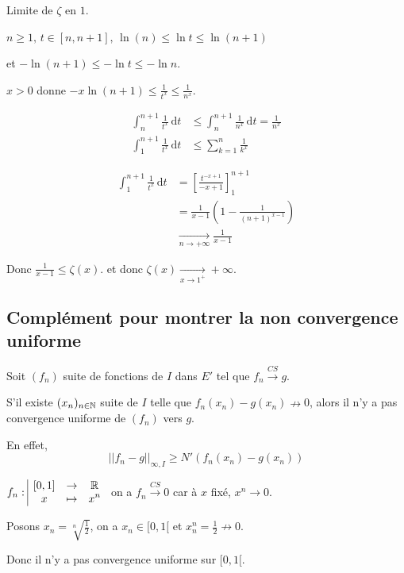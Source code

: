 \begin{exemple}
    Limite de $\zeta$ en $1$.

    $n \geqslant 1, \, t \in [n, n+ 1], \, \ln(n) \leqslant \ln t \leqslant \ln (n+ 1)$
    
    et $-\ln(n + 1) \leqslant - \ln t \leqslant - \ln n$.

    $x > 0$ donne $- x \ln(n + 1) \leqslant \frac 1 {t^x} \leqslant \frac 1 {n^x}$.

    \begin{align}
        \int_n^{n + 1} \frac 1 {t^x} \,\mathrm{d}t & \leqslant \int_n^{n + 1} \frac 1 {n^x} \,\mathrm{d}t = \frac 1 {n^x} \\
        \int_1^{n + 1} \frac 1 {t^x} \, \mathrm{d}t & \leqslant \sum_{k = 1 }^{n } \frac 1 {k^x} 
    \end{align}

    \begin{align}
        \int_{1 }^{n + 1 } \frac 1 {t^x} \, \mathrm{d}t &  = \left[ \frac{t^{- x + 1}}{- x + 1} \right]_{1}^{n + 1} \\
        & = \frac{1 }{x - 1} \left( 1 - \frac 1 {(n + 1)^{x - 1}} \right)\\
        & \xrightarrow[n \to + \infty]{} \frac 1 {x - 1}
    \end{align} 

    Donc $\frac 1 {x - 1} \leqslant \zeta(x)$. et donc $\zeta(x) \xrightarrow[x \to 1^+]{} + \infty$.
\end{exemple}

\subsection{Complément pour montrer la non convergence uniforme}

\begin{proposition}{}{}
    Soit $(f_n)$ suite de fonctions de $I$ dans $E'$ tel que $f_n \xrightarrow{CS} g$. 

    S'il existe $(x_n)_{n \in \mathbb{N}}$ suite de $I$ telle que 
    $f_n(x_n) - g(x_n) \nrightarrow 0$, alors il n'y a pas convergence uniforme de $(f_n)$ vers $g$.

    En effet, $$||f_n - g||_{\infty, I} \geqslant N'(f_n(x_n) - g(x_n))$$
\end{proposition}

\begin{exemple}
    $f_n: \space \begin{array}{|ccc} \displaystyle [0, 1] & \to & \displaystyle \mathbb{R} \\ \displaystyle x & \mapsto & \displaystyle x^n \end{array}$ on a $f_n \xrightarrow{CS} 0$
    car à $x$ fixé, $x^n \to 0$.

    Posons $x_n = \sqrt[n]{\frac 1 2}$, on a $x_n \in [0, 1[$ et 
    $x_n^n = \frac 1 2 \nrightarrow 0$. 

    Donc il n'y a pas convergence uniforme sur $[0, 1[$. 
\end{exemple}


